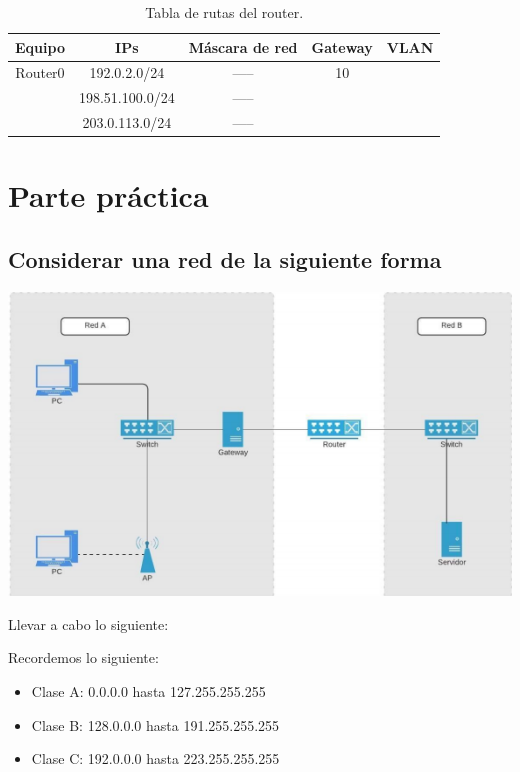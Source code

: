 \documentclass[spanish,12pt,letterpaper]{article}
\begin{document}
\begin{table}[H]
  \centering
  \begin{tabular}{| c | c | c | c | c |}\hline
    Equipo & IPs & Máscara de red & Gateway & VLAN \\ \hline
    Router0 & 192.0.2.0/24 & ----- & 10 & \\
    & 198.51.100.0/24 & ----- &  & \\
    & 203.0.113.0/24 & ----- &  & \\\hline
  \end{tabular}
  \caption{Tabla de rutas del router.}
\end{table}
\section{Parte práctica}
\subsection{Considerar una red de la siguiente forma}
\begin{center}
  \includegraphics[scale=.75]{red.png}
\end{center}
Llevar a cabo lo siguiente:

  Recordemos lo siguiente:
  \begin{itemize}
  \item Clase A: 0.0.0.0 hasta 127.255.255.255
  \item Clase B: 128.0.0.0 hasta 191.255.255.255
  \item Clase C: 192.0.0.0 hasta 223.255.255.255
  \end{itemize}
  
\end{document}
